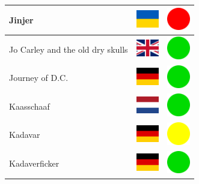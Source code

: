 \documentclass[12pt, a4paper, twoside]{report}
\begin{document}
\begin{center}
\begin{longtable}{|p{5cm}|p{2cm}|p{2cm}|}
 Jinjer                                                     & \includegraphics[width=1cm]{../4x3/ua} &   \includegraphics[width=1cm]{../likes/n} \\ \hline
 Jo Carley and the old dry skulls                           & \includegraphics[width=1cm]{../4x3/gb} &   \includegraphics[width=1cm]{../likes/y} \\ \hline
 Journey of D.C.                                            & \includegraphics[width=1cm]{../4x3/de} &   \includegraphics[width=1cm]{../likes/y} \\ \hline
 Kaasschaaf                                                 & \includegraphics[width=1cm]{../4x3/nl} &   \includegraphics[width=1cm]{../likes/y} \\ \hline
 Kadavar                                                    & \includegraphics[width=1cm]{../4x3/de} &   \includegraphics[width=1cm]{../likes/m} \\ \hline
 Kadaverficker                                              & \includegraphics[width=1cm]{../4x3/de} &   \includegraphics[width=1cm]{../likes/y} \\ \hline

\end{longtable}
\end{center}
\end{document}
